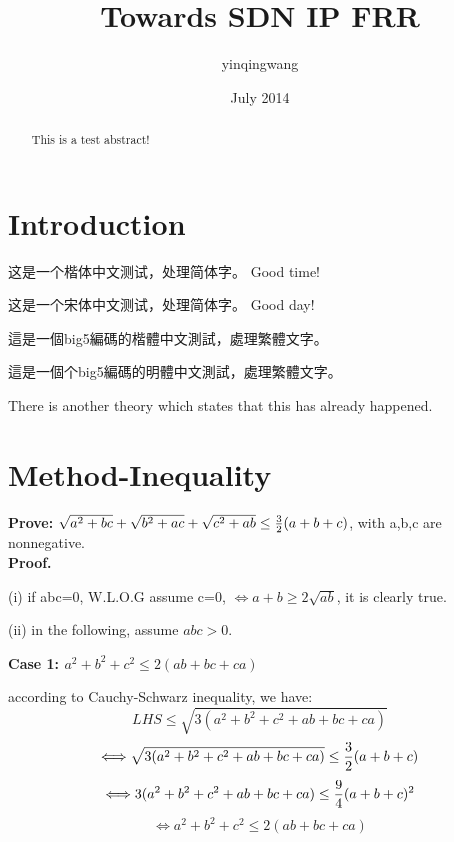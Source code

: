 \documentclass[11pt,a4paper]{article}
\title{Towards SDN IP FRR}
\author{yinqingwang }
\date{July 2014}
\begin{document}
\maketitle
\tableofcontents
\begin{abstract}
This is a test abstract!

\end{abstract}
\section{Introduction}
\begin{CJK}{UTF8}{gkai}
   	
   	这是一个楷体中文测试，处理简体字。 Good time!
   	
\end{CJK}
\begin{CJK}{UTF8}{gbsn}
	
	这是一个宋体中文测试，处理简体字。 Good day!
	
\end{CJK}

\begin{CJK}{UTF8}{bkai}
	
	這是一個big5編碼的楷體中文測試，處理繁體文字。
	
\end{CJK}

\begin{CJK}{UTF8}{bsmi}
	
	這是一個个big5編碼的明體中文測試，處理繁體文字。
	
\end{CJK}


There is another theory which states that this has already happened.\citep{monsanto2013composing}

\section{Method-Inequality}

\textbf{Prove:} $\sqrt{a^2+bc} + \sqrt{b^2+ac} + \sqrt{c^2+ab}\leq{3\over2}(a+b+c)$, with a,b,c are nonnegative.
\\\textbf{Proof.} 

(i) if abc=0, W.L.O.G assume c=0, $\Longleftrightarrow a+b \geq 2\sqrt{ab}$, it is clearly true.

(ii) in the following, assume $abc > 0$.

\textbf{Case 1: $a^2+b^2+c^2 \leq 2(ab+bc+ca)$}

according to Cauchy-Schwarz inequality, we have:
$$LHS \leq \sqrt{3(a^2+b^2+c^2+ab+bc+ca)}$$
$$\Longleftrightarrow \sqrt{3(a^2+b^2+c^2+ab+bc+ca)} \leq {3\over2}(a+b+c)$$
$$\Longleftrightarrow 3(a^2+b^2+c^2+ab+bc+ca) \leq {9\over4}(a+b+c)^2$$
$$\Longleftrightarrow a^2+b^2+c^2 \leq 2(ab+bc+ca)$$
\end{document}
